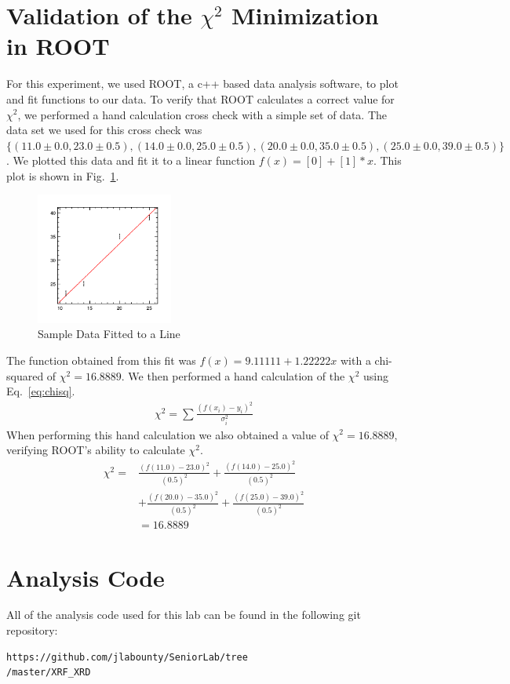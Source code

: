 \documentclass[%
 reprint,
 amsmath,amssymb,
 aps,
 pra,
]{revtex4-1}
\begin{document}
\begin{appendix}

\section{Validation of the $\chi^2$ Minimization in ROOT} \label{section:root}
For this experiment, we used ROOT, a c++ based data analysis software, to plot and fit functions to our data. To verify that ROOT calculates a correct value for $\chi^{2}$, we performed a hand calculation cross check with a simple set of data. The data set we used for this cross check was $\{ (11.0 \pm 0.0, 23.0 \pm 0.5), (14.0 \pm 0.0, 25.0 \pm 0.5), (20.0 \pm 0.0, 35.0 \pm 0.5), (25.0 \pm 0.0, 39.0 \pm 0.5) \}$. We plotted this data and fit it to a linear function $f(x) = [0] + [1]*x$. This plot is shown in Fig.~\ref{Fig:rootproof}.
\begin{figure}[H]
	\centering
	\includegraphics[width=0.4\textwidth]{rootproof.png}
	\caption{Sample Data Fitted to a Line}
	\label{Fig:rootproof}
\end{figure}
The function obtained from this fit was $f(x) = 9.11111 + 1.22222x$ with a chi-squared of $\chi ^{2} = 16.8889$. We then performed a hand calculation of the $\chi ^{2}$ using Eq.~\ref{eq:chisq}.
\begin{gather}\label{eq:chisq}
\chi ^{2} = \sum \frac{(f(x_i) - y_i)^{2}}{\sigma_i^2}
\end{gather}
When performing this hand calculation we also obtained a value of $\chi ^{2} = 16.8889$, verifying ROOT's ability to calculate $\chi ^{2}$.
\begin{align*}
\chi ^{2} =& \frac{(f(11.0) - 23.0)^{2}}{(0.5)^2} + \frac{(f(14.0) - 25.0)^{2}}{(0.5)^2} \\
&+ \frac{(f(20.0) - 35.0)^2}{(0.5)^2} + \frac{(f(25.0) - 39.0)^{2}}{(0.5)^2} \\
&= 16.8889
\end{align*}

\section{Analysis Code} \label{section:analysis_code}
All of the analysis code used for this lab can be found in the following git repository: 
\begin{verbatim}
https://github.com/jlabounty/SeniorLab/tree
/master/XRF_XRD
\end{verbatim}

\end{appendix}
\end{document}
